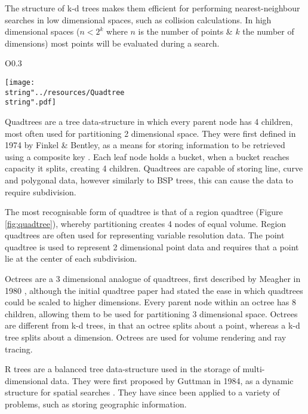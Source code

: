       The structure of k-d trees makes them efficient for performing nearest-neighbour searches in low dimensional spaces, such as collision calculations. In high dimensional spaces ($n < 2^{k}$ where $n$ is the number of points \& $k$ the number of dimensions) most points will be evaluated during a search.
\begin{wrapfigure}{O}{0.3\columnwidth}
  \begin{centering}
    \texttt{[image: \\string"../resources/Quadtree\\string".pdf]}
  \par\end{centering}
  \protect\caption[A visual representation of region quadtree.]{\label{fig:quadtree}A visual representation of region quadtree. The black outline shows the root node, whose child nodes have a red outline, this continues through orange, green and blue.}
\end{wrapfigure}
      Quadtrees are a tree data-structure in which every parent node has 4 children, most often used for partitioning 2 dimensional space. They were first defined in 1974 by Finkel \& Bentley, as a means for storing information to be retrieved using a composite key \cite{FB74}. Each leaf node holds a bucket, when a bucket reaches capacity it splits, creating 4 children. Quadtrees are capable of storing line, curve and polygonal data, however similarly to BSP trees, this can cause the data to require subdivision.
      
      The most recognisable form of quadtree is that of a region quadtree (Figure \ref{fig:quadtree}), whereby partitioning creates 4 nodes of equal volume. Region quadtrees are often used for representing variable resolution data. The point quadtree is used to represent 2 dimensional point data and requires that a point lie at the center of each subdivision.
      
      Octrees are a 3 dimensional analogue of quadtrees, first described by Meagher in 1980 \cite{Mea80}, although the initial quadtree paper \cite{FB74} had stated the ease in which quadtrees could be scaled to higher dimensions. Every parent node within an octree has 8 children, allowing them to be used for partitioning 3 dimensional space. Octrees are different from k-d trees, in that an octree splits about a point, whereas a k-d tree splits about a dimension. Octrees are used for volume rendering and ray tracing.
      
      R trees are a balanced tree data-structure used in the storage of multi-dimensional data. They were first proposed by Guttman in 1984, as a dynamic structure for spatial searches \cite{Gut84}. They have since been applied to a variety of problems, such as storing geographic information. 

